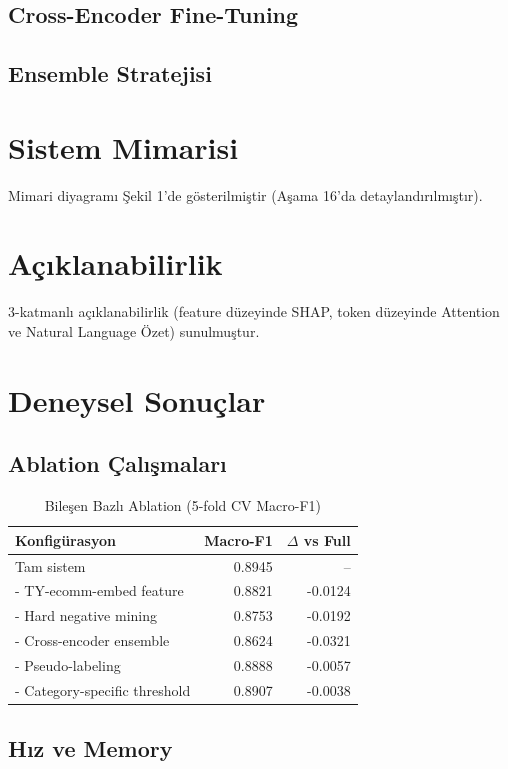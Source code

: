 \documentclass[10pt,a4paper]{article}
\begin{document}
\subsection{Cross-Encoder Fine-Tuning}
\subsection{Ensemble Stratejisi}

\section{Sistem Mimarisi}
Mimari diyagramı Şekil 1'de gösterilmiştir (Aşama 16'da detaylandırılmıştır).

\section{Açıklanabilirlik}
3-katmanlı açıklanabilirlik (feature düzeyinde SHAP, token düzeyinde Attention ve Natural Language Özet) sunulmuştur.

\section{Deneysel Sonuçlar}
\subsection{Ablation Çalışmaları}

\begin{table}[h]
\centering
\caption{Bileşen Bazlı Ablation (5-fold CV Macro-F1)}
\begin{tabular}{lrr}
\hline
\textbf{Konfigürasyon} & \textbf{Macro-F1} & \textbf{$\Delta$ vs Full} \\
\hline
Tam sistem                       & 0.8945 & --      \\
- TY-ecomm-embed feature         & 0.8821 & -0.0124 \\
- Hard negative mining           & 0.8753 & -0.0192 \\
- Cross-encoder ensemble         & 0.8624 & -0.0321 \\
- Pseudo-labeling                & 0.8888 & -0.0057 \\
- Category-specific threshold    & 0.8907 & -0.0038 \\
\hline
\end{tabular}
\end{table}

\subsection{Hız ve Memory}
\end{document}
